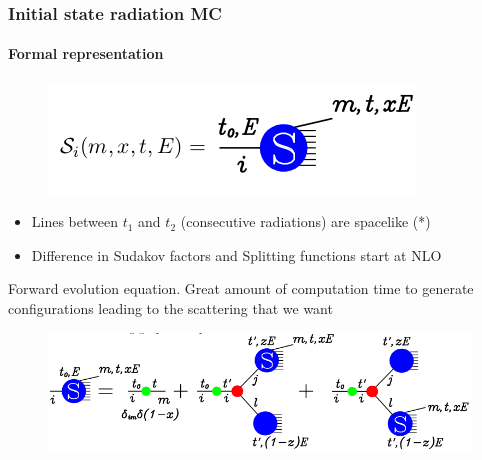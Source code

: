 \documentclass[aspectratio=43]{beamer}
\begin{document}
\begin{frame}
	
	\frametitle{Initial state radiation MC}
	\framesubtitle{Formal representation}
	
	\begin{figure}
		\includegraphics[width = 4 cm]{plots/shower_ISR_1.png}
	\end{figure}
	
	\begin{itemize} 
		\item \footnotesize Lines between $t_{1}$ and $t_{2}$ (consecutive radiations) are spacelike {\color{blue}(*)}
		\item \footnotesize Difference in Sudakov factors and Splitting functions start at NLO
	\end{itemize}
	
	\footnotesize Forward evolution equation. Great amount of computation time to generate configurations leading to the scattering that we want
	\begin{figure}
		\includegraphics[width = 8.5 cm]{plots/shower_ISR_2.png}
	\end{figure}

\end{frame}
\end{document}
